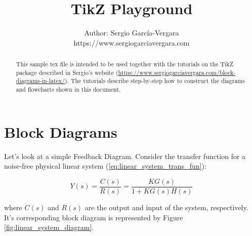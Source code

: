 \documentclass{article}
\begin{document}

\title{TikZ Playground}
\author{
  Author: Sergio Garc\'{i}a-Vergara \\
  \small{https://www.sergiogarciavergara.com}
}

\maketitle


\begin{abstract}

  This sample tex file is intended to be used together with the tutorials on the
  TikZ package described in Sergio's website
  (\href{https://www.sergiogarciavergara.com/block-diagrams-in-latex/}{https://www.sergiogarciavergara.com/block-diagrams-in-latex/}). The
  tutorials describe step-by-step how to construct the diagrams and flowcharts
  shown in this document.

\end{abstract}



\section{Block Diagrams}

Let's look at a simple Feedback Diagram. Consider the transfer function for a
noise-free physical linear system (\ref{eq:linear_system_trans_fun}):

\begin{equation}\label{eq:linear_system_trans_fun}
Y(s) = \frac{C(s)}{R(s)} = \frac{KG(s)}{1 + KG(s)H(s)}
\end{equation}

\noindent
where $C(s)$ and $R(s)$ are the output and input of the system,
respectively. It's corresponding block diagram is represented by Figure
\ref{fig:linear_system_diagram}.
\end{document}
